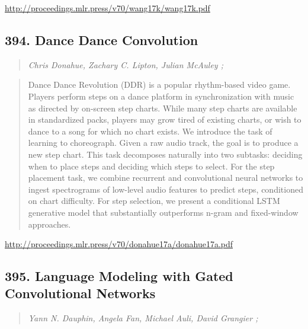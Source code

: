 \documentclass{article}
\begin{document}
\href{http://proceedings.mlr.press/v70/wang17k/wang17k.pdf}{http://proceedings.mlr.press/v70/wang17k/wang17k.pdf}

\subsection{394. Dance Dance Convolution}

\begin{quote}
\footnotesize{\textit{Chris Donahue, Zachary C. Lipton, Julian McAuley ;}}
\end{quote}

\begin{quote}
    Dance Dance Revolution (DDR) is a popular rhythm-based video game. Players perform steps on a dance platform in synchronization with music as directed by on-screen step charts. While many step charts are available in standardized packs, players may grow tired of existing charts, or wish to dance to a song for which no chart exists. We introduce the task of learning to choreograph. Given a raw audio track, the goal is to produce a new step chart. This task decomposes naturally into two subtasks: deciding when to place steps and deciding which steps to select. For the step placement task, we combine recurrent and convolutional neural networks to ingest spectrograms of low-level audio features to predict steps, conditioned on chart difficulty. For step selection, we present a conditional LSTM generative model that substantially outperforms n-gram and fixed-window approaches.  \end{quote}

\href{http://proceedings.mlr.press/v70/donahue17a/donahue17a.pdf}{http://proceedings.mlr.press/v70/donahue17a/donahue17a.pdf}

\subsection{395. Language Modeling with Gated Convolutional Networks}

\begin{quote}
\footnotesize{\textit{Yann N. Dauphin, Angela Fan, Michael Auli, David Grangier ;}}
\end{quote}
\end{document}
